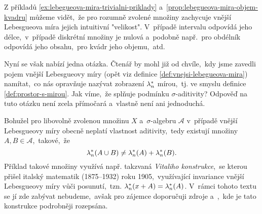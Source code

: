 Z příkladů \ref{ex:lebegueova-mira-trivialni-priklady} a~\ref{prop:lebegueova-mira-objem-kvadru} můžeme vidět,~že pro rozumně zvolené množiny zachycuje vnější Lebesgueova míra jejich intuitivní "velikost". V~případě intervalu odpovídá jeho délce,~v~případě diskrétní množiny je nulová a~podobně např.~pro obdélník odpovídá jeho obsahu,~pro kvádr jeho objemu,~atd.

Nyní se však nabízí jedna otázka. Čtenář by mohl již od chvíle,~kdy jsme zavedli pojem vnější Lebesgueovy míry (opět viz definice \ref{def:vnejsi-lebegueova-mira}) namítat,~co nás opravňuje nazývat zobrazení $\lambda_n^*$ mírou,~tj. ve smyslu definice \ref{def:prostor-s-mirou}. Jak víme,~že splňuje podmínku $\sigma$-aditivity? Odpověď na tuto otázku není zcela přímočará a~vlastně není ani jednoduchá.

Bohužel pro libovolně zvolenou množinu $X$ a~$\sigma$-algebru $\mathcal{A}$ v~případě vnější Lebesgueovy míry obecně neplatí vlastnost aditivity,~tedy existují množiny $A,B\in\mathcal{A}$,~takové,~že
\[\lambda_n^*(A\cup B)\neq\lambda_n^*(A)+\lambda_n^*(B).\]
Příklad takové množiny využívá např. takzvaná \emph{Vitaliho konstrukce},~se kterou přišel italský matematik  (1875--1932) roku 1905,~využívající invariance vnější Lebesgueovy míry vůči posunutí,~tzn. $\lambda_n^*(x+A)=\lambda_n^*(A)$. \cite{OConnor2025} V~rámci tohoto textu se jí zde zabývat nebudeme,~avšak pro zájemce doporučuji zdroje \citep[str. 3]{Lukes2013} a~\cite{Verner2025},~kde je tato konstrukce podrobněji rozepsána.


